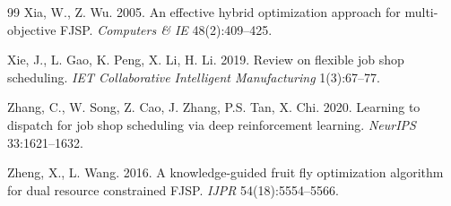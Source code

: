 \documentclass[12pt]{article}
\begin{document}
\begin{thebibliography}{99}
 Xia, W., Z. Wu. 2005. An effective hybrid optimization approach for multi-objective FJSP. \textit{Computers \& IE} 48(2):409--425.

 Xie, J., L. Gao, K. Peng, X. Li, H. Li. 2019. Review on flexible job shop scheduling. \textit{IET Collaborative Intelligent Manufacturing} 1(3):67--77.

 Zhang, C., W. Song, Z. Cao, J. Zhang, P.S. Tan, X. Chi. 2020. Learning to dispatch for job shop scheduling via deep reinforcement learning. \textit{NeurIPS} 33:1621--1632.

 Zheng, X., L. Wang. 2016. A knowledge-guided fruit fly optimization algorithm for dual resource constrained FJSP. \textit{IJPR} 54(18):5554--5566.

\end{thebibliography}
\end{document}
